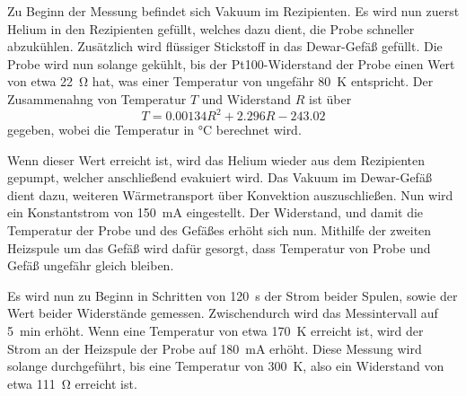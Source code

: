     Zu Beginn der Messung befindet sich Vakuum im Rezipienten.
    Es wird nun zuerst Helium in den Rezipienten gefüllt,
    welches dazu dient,
    die Probe schneller abzukühlen.
    Zusätzlich wird flüssiger Stickstoff in das Dewar-Gefäß gefüllt.
    Die Probe wird nun solange gekühlt,
    bis der Pt100-Widerstand der Probe einen Wert von etwa \SI{22}{\ohm} hat,
    was einer Temperatur von ungefähr \SI{80}{\kelvin} entspricht.
    Der Zusammenahng von Temperatur $T$ und Widerstand $R$ ist über
    \begin{equation}
        T = 0.00134 R^2 + 2.296 R - 243.02
    \end{equation}
    gegeben,
    wobei die Temperatur in \si{\celsius} berechnet wird.

    Wenn dieser Wert erreicht ist,
    wird das Helium wieder aus dem Rezipienten gepumpt,
    welcher anschließend evakuiert wird.
    Das Vakuum im Dewar-Gefäß dient dazu,
    weiteren Wärmetransport über Konvektion auszuschließen.
    Nun wird ein Konstantstrom von \SI{150}{\milli\ampere} eingestellt.
    Der Widerstand,
    und damit die Temperatur der Probe und des Gefäßes erhöht sich nun.
    Mithilfe der zweiten Heizspule um das Gefäß wird dafür gesorgt,
    dass Temperatur von Probe und Gefäß ungefähr gleich bleiben.

    Es wird nun zu Beginn in Schritten von \SI{120}{\second} der Strom beider Spulen,
    sowie der Wert beider Widerstände gemessen.
    Zwischendurch wird das Messintervall auf \SI{5}{\minute} erhöht.
    Wenn eine Temperatur von etwa \SI{170}{\kelvin} erreicht ist,
    wird der Strom an der Heizspule der Probe auf \SI{180}{\milli\ampere} erhöht.
    Diese Messung wird solange durchgeführt,
    bis eine Temperatur von \SI{300}{\kelvin},
    also ein Widerstand von etwa \SI{111}{\ohm} erreicht ist.

